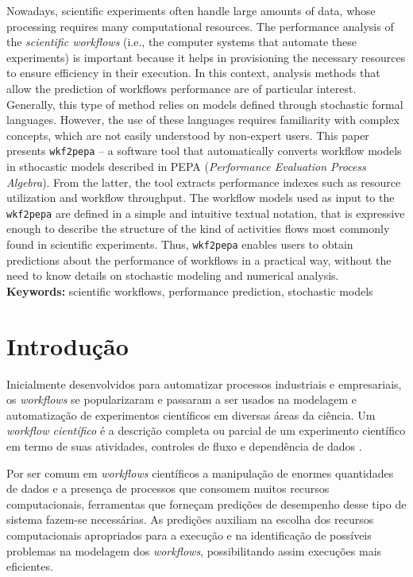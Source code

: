 \documentclass[a4paper,10pt]{article}
\begin{document}
Nowadays, scientific experiments often handle large amounts of data, whose processing requires many computational resources. The performance analysis of the \textit{scientific workflows} (i.e., the computer systems that automate these experiments) is important because it helps in provisioning the necessary resources to ensure efficiency in their execution. In this context, analysis methods that allow the prediction of workflows performance are of particular interest. Generally, this type of method relies on models defined through stochastic formal languages. However, the use of these languages requires familiarity with complex concepts, which are not easily understood by non-expert users. This paper presents \texttt{wkf2pepa} -- a software tool  that automatically converts  workflow models in sthocastic models described in PEPA (\textit{Performance Evaluation Process Algebra}). From the latter, the tool extracts performance indexes such as resource utilization and workflow throughput. The workflow models used as input to the \texttt{wkf2pepa} are defined in a simple and intuitive textual notation, that is expressive enough to describe the structure of the kind of activities flows most commonly found in scientific experiments. Thus, \texttt{wkf2pepa} enables users to obtain predictions about the performance of workflows in a practical way, without the need to know details on stochastic modeling and numerical analysis.\\

\noindent \textbf{Keywords:} scientific workflows, performance prediction, stochastic models

    \thispagestyle{fancy}

    \newpage
    \section*{Introdução}
        Inicialmente desenvolvidos para automatizar processos industriais e empresariais, os \emph{workflows} se popularizaram e passaram a ser usados na modelagem e automatização de experimentos científicos em diversas áreas da ciência. Um \emph{workflow científico} é a descrição completa ou parcial de um experimento científico em termo de suas atividades, controles de fluxo e dependência de dados \cite{phd:gadelha12}.

        Por ser comum em \emph{workflows} científicos a manipulação de enormes quantidades de dados e a presença de processos que consomem muitos recursos computacionais, ferramentas que forneçam predições de desempenho desse tipo de sistema fazem-se necessárias. As predições auxiliam na escolha dos recursos computacionais apropriados para a execução e na identificação de possíveis problemas na modelagem dos \emph{workflows}, possibilitando assim execuções mais eficientes.
\end{document}
